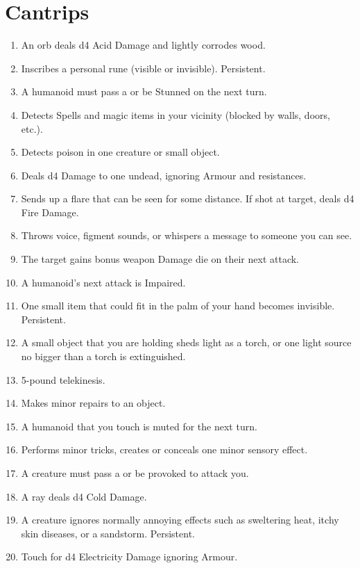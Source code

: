 \documentclass[itdr]{subfiles}
\begin{document}
\section{Cantrips}
\def \spellcircle {C}
\begin{enumerate}
	\item {} An orb deals d4 Acid Damage and lightly corrodes wood.
	\item {} Inscribes a personal rune (visible or invisible). Persistent.
	\item {} A humanoid must pass a  or be Stunned on the next turn.
	\item {} Detects Spells and magic items in your vicinity (blocked by walls, doors, etc.).
	\item {} Detects poison in one creature or small object.
	\item {} Deals d4 Damage to one \mbox{undead}, ignoring Armour and resistances.
	\item {} Sends up a flare that can be seen for some distance. If shot at target, deals d4 Fire Damage.
	\item {} Throws voice, figment sounds, or whispers a message to someone you can see.
	\item {} The target gains bonus weapon Damage die on their next attack.
	\item {} A humanoid's next attack is Impaired.
	\item {} One small item that could fit in the palm of your hand becomes invisible. Persistent.
	\item {} A small object that you are holding sheds light as a torch, or one light source no bigger than a torch is extinguished.
	\item {} 5-pound telekinesis.
	\item {} Makes minor repairs to an object.
	\item {} A humanoid that you touch is muted for the next turn.
	\item {} Performs minor tricks, creates or conceals one minor sensory effect.
	\item {} A creature must pass a  or be provoked to attack you.
	\item {} A ray deals d4 Cold Damage.
	\item {} A creature ignores normally annoying effects such as sweltering heat, itchy skin diseases, or a sandstorm. Persistent.
	\item {} Touch for d4 Electricity Damage ignoring Armour.
\end{enumerate}
\end{document}
